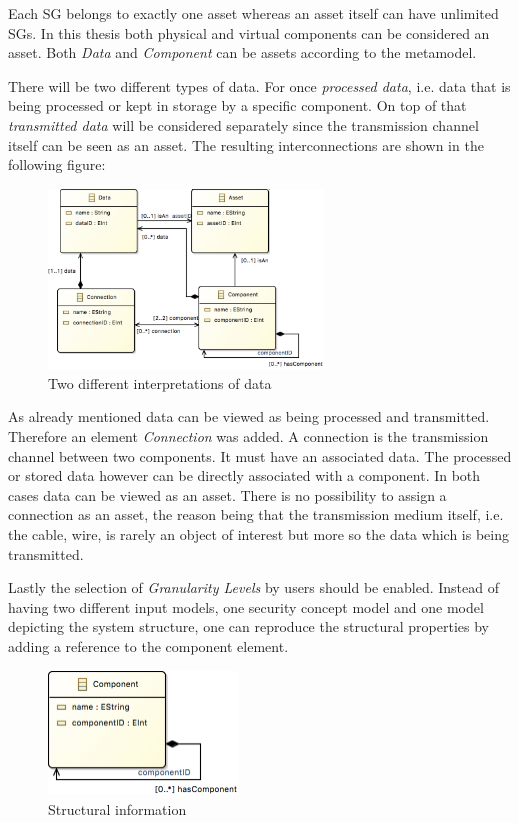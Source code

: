 Each SG belongs to exactly one asset whereas an asset itself can have unlimited SGs. In this thesis both physical and virtual components can be considered an asset. Both \textit{Data} and \textit{Component} can be assets according to the metamodel. 

There will be two different types of data. For once \textit{processed data}, i.e. data that is being processed or kept in storage by a specific component. On top of that \textit{transmitted data} will be considered separately since the transmission channel itself can be seen as an asset. The resulting interconnections are shown in the following figure:

\begin{figure}[H]
\centering
\includegraphics[width=0.65\textwidth]{pictures/two_data.png}
\caption{Two different interpretations of data}
\label{fig:data}
\end{figure} 

As already mentioned data can be viewed as being processed and transmitted. Therefore an element \textit{Connection} was added. A connection is the transmission channel between two components. It must have an associated data. The processed or stored data however can be directly associated with a component. In both cases data can be viewed as an asset. There is no possibility to assign a connection as an asset, the reason being that the transmission medium itself, i.e. the cable, wire, is rarely an object of interest but more so the data which is being transmitted.

Lastly the selection of \textit{Granularity Levels} by users should be enabled. Instead of having two different input models, one security concept model and one model depicting the system structure, one can reproduce the structural properties by adding a reference to the component element.      

\begin{figure}[H]
\centering
\includegraphics[width=0.45\textwidth]{pictures/component_structure.png}
\caption{Structural information}
\label{fig:data}
\end{figure} 

